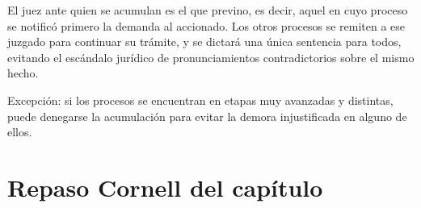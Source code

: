 \documentclass[12pt,oneside]{book}
\begin{document}
El juez ante quien se acumulan es el que previno, es decir, aquel en cuyo proceso se notificó primero la demanda al accionado. Los otros procesos se remiten a ese juzgado para continuar su trámite, y se dictará una única sentencia para todos, evitando el escándalo jurídico de pronunciamientos contradictorios sobre el mismo hecho.

\begin{note}
Excepción: si los procesos se encuentran en etapas muy avanzadas y distintas, puede denegarse la acumulación para evitar la demora injustificada en alguno de ellos.
\end{note}

\section*{Repaso Cornell del capítulo}
\end{document}

